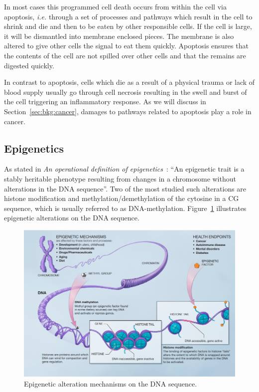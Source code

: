 In most cases this programmed cell death occurs from within the cell via apoptosis, \emph{i.e.} through a set of processes and pathways which result in the cell to shrink and die and then to be eaten by other responsible cells. If the cell is large, it will be dismantled into membrane enclosed pieces. The membrane is also altered to give other cells the signal to eat them quickly. Apoptosis ensures that the contents of the cell are not spilled over other cells and that the remains are digested quickly.

In contrast to apoptosis, cells which die as a result of a physical trauma or lack of blood supply usually go through cell necrosis resulting in the swell and burst of the cell triggering an inflammatory response. As we will discuss in Section~\ref{sec:bkg:cancer}, damages to pathways related to apoptosis play a role in cancer.

\subsection{Epigenetics}
\label{sec:bkg:epigenetics}
As stated in \emph{An operational definition of epigenetics}~\cite{berger2009operational}: ``An epigenetic trait is a stably heritable phenotype resulting from changes in a chromosome without alterations in the DNA sequence''. Two of the most studied such alterations are histone modification and methylation/demethylation of the cytosine in a CG sequence, which is usually referred to as DNA-methylation. Figure~\ref{fig:bkg:epigenetics} illustrates epigenetic alterations on the DNA sequence.

\begin{figure}[!ht]
  \centering
  \includegraphics[width=1\textwidth]{figs/background/epigeneticmechanisms}
  \caption[Epigenetic alteration mechanisms on the DNA sequence.]{Epigenetic alteration mechanisms on the DNA sequence\protect\footnotemark.}
  \label{fig:bkg:epigenetics}
\end{figure}


